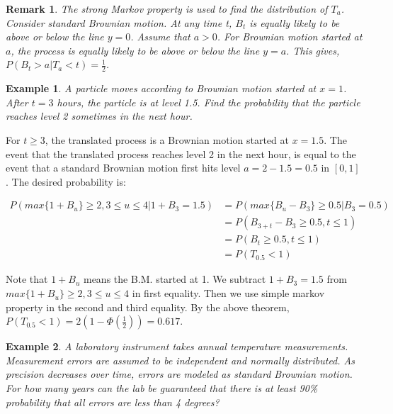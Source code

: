 \documentclass[12pt]{article}
\newtheorem*{remark}{Remark}
\newtheorem{example}{Example}
\begin{document}
\begin{remark}
    The strong Markov property is used to find the distribution of $T_a$. Consider standard Brownian motion. At any time t, $B_t$ is equally likely to be above or below the line $y = 0$. Assume that $a > 0$. For Brownian motion started at $a$, the process is equally likely to be above or below the line $y = a$. This gives, $P(B_t > a | T_a < t) = \frac{1}{2}$. 
\end{remark}

\begin{example}
    A particle moves according to Brownian motion started at $x = 1$. After $t = 3$ hours, the particle is at level 1.5. Find the probability that the particle reaches level 2 sometimes in the next hour.
\end{example}

\noindent For $t \geq 3$, the translated process is a Brownian motion started at $x = 1.5$. The event that the translated process reaches level 2 in the next hour, is equal to the event that a standard Brownian motion first hits level $a = 2 - 1.5 = 0.5$ in $[0, 1]$. The desired probability is:
\begin{center}
    \begin{align*}
        P(max\{1+B_u\} \geq 2, 3 \leq u \leq 4 | 1 + B_3 = 1.5) & = P(max\{B_u - B_3\} \geq 0.5 | B_3 = 0.5) \\
        & = P(B_{3+t} - B_3 \geq 0.5, t \leq 1)\\
        & = P(B_t \geq 0.5, t \leq 1) \\
        & = P(T_{0.5} < 1)
    \end{align*}
\end{center}

\noindent Note that $1 + B_u$ means the B.M. started at 1. We subtract $1 + B_3 = 1.5$ from $max\{1+B_u\} \geq 2, 3 \leq u \leq 4$ in first equality. Then we use simple markov property in the second and third equality. By the above theorem, $P(T_{0.5} < 1) = 2(1 - \Phi(\frac{1}{2})) = 0.617$.

\begin{example}
    A laboratory instrument takes annual temperature measurements. Measurement errors are assumed to be independent and normally distributed. As precision decreases over time, errors are modeled as standard Brownian motion. For how many years can the lab be guaranteed that there is at least 90\% probability that all errors are less than 4 degrees?
\end{example}
\end{document}
